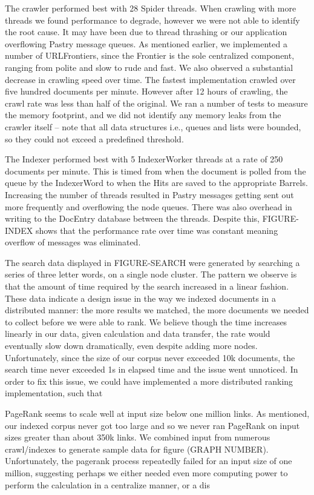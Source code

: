 \documentclass[11pt, letterpaper, oneside, twocolumn]{article}
\begin{document}
The crawler  performed best with  28 Spider threads. When  crawling with
more threads we  found performance to degrade, however we  were not able
to identify the root cause. It may  have been due to thread thrashing or
our application overflowing Pastry message queues. As mentioned earlier,
we implemented a number of URLFrontiers,  since the Frontier is the sole
centralized component, ranging from polite and slow to rude and fast. We
also  observed a  substantial  decrease in crawling  speed over time.
The fastest implementation crawled over five hundred documents per
minute. However after 12 hours of crawling, the crawl rate was less than half of
the original. We ran a number of tests to measure the memory footprint,
and we did not identify any memory leaks from the crawler itself -- note
that all  data structures i.e., queues  and lists were bounded,  so they
could not exceed a predefined threshold.

The Indexer performed best with 5 IndexerWorker threads at a rate of 250 documents per minute. 
This is timed from when the document is polled from the queue by the IndexerWord to when the Hits are saved to the appropriate Barrels. 
Increasing the number of threads resulted in Pastry messages getting sent out more frequently and overflowing the node queues. 
There was also overhead in writing to the DocEntry database between the threads. 
Despite this, FIGURE-INDEX shows that the performance rate over time was constant meaning overflow of messages was eliminated. 

The search data displayed in FIGURE-SEARCH were generated by searching a series of three letter words, on a single node cluster.
The pattern we observe is that the amount of time required by the search increased in a linear fashion.
These data indicate a design issue in the way we indexed documents in a distributed manner: the more results we matched, the more documents we needed to collect before we were able to rank.
We believe though the time increases linearly in our data, given calculation and data transfer, the rate would eventually slow down dramatically, even despite adding more nodes.
Unfortunately, since the size of our corpus never exceeded 10k documents, the search time never exceeded 1s in elapsed time and the issue went unnoticed.
In order to fix this issue, we could have implemented a more distributed ranking implementation, such that 

PageRank seems to scale well at input size below one million links.
As mentioned, our indexed corpus never got too large and so we never ran PageRank on input sizes greater than about 350k links.
We combined input from numerous crawl/indexes to generate sample data for figure (GRAPH NUMBER).
Unfortunately, the pagerank process repeatedly failed for an input size of one million, suggesting perhaps we either needed even more computing power to perform the calculation in a centralize manner, or a dis
\end{document}
